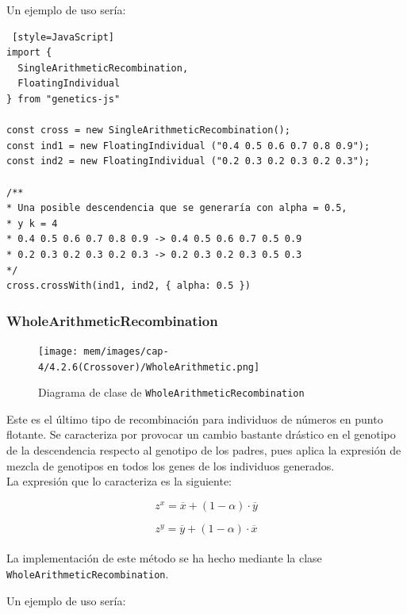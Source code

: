Un ejemplo de uso sería: \\

\begin{lstlisting} [style=JavaScript]
import { 
  SingleArithmeticRecombination, 
  FloatingIndividual 
} from "genetics-js"

const cross = new SingleArithmeticRecombination();
const ind1 = new FloatingIndividual ("0.4 0.5 0.6 0.7 0.8 0.9");
const ind2 = new FloatingIndividual ("0.2 0.3 0.2 0.3 0.2 0.3");

/**
* Una posible descendencia que se generaría con alpha = 0.5,
* y k = 4
* 0.4 0.5 0.6 0.7 0.8 0.9 -> 0.4 0.5 0.6 0.7 0.5 0.9
* 0.2 0.3 0.2 0.3 0.2 0.3 -> 0.2 0.3 0.2 0.3 0.5 0.3
*/
cross.crossWith(ind1, ind2, { alpha: 0.5 })
\end{lstlisting}

\subsubsection{WholeArithmeticRecombination}

\begin{figure}[ht]
    \centering
    \texttt{[image: mem/images/cap-4/4.2.6(Crossover)/WholeArithmetic.png]}
    \caption{Diagrama de clase de \texttt{WholeArithmeticRecombination}}
    \label{fig:my_label}
\end{figure}

Este es el último tipo de recombinación para individuos de números en punto flotante. Se caracteriza por provocar un cambio bastante drástico en el genotipo de la descendencia respecto al genotipo de los padres, pues aplica la expresión de mezcla de genotipos en todos los genes de los individuos generados. \\

La expresión que lo caracteriza es la siguiente:

\begin{equation}
    z^x = \overline{x} + (1 - \alpha) \cdot \overline{y}
\end{equation}

\begin{equation}
    z^y = \overline{y} + (1 - \alpha) \cdot \overline{x}
\end{equation}
\\
La implementación de este método se ha hecho mediante la clase \texttt{WholeArithmeticRecombination}. \\

\clearpage

Un ejemplo de uso sería: \\

